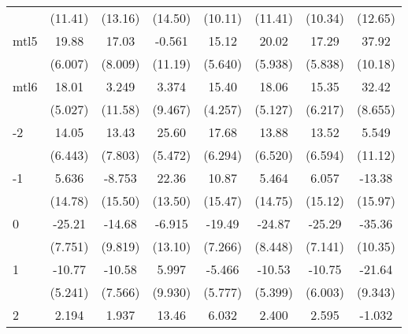 \documentclass{article}
\begin{document}
{\begin{longtable}{l*{7}{c}}
                &  (11.41)         &  (13.16)         &  (14.50)         &  (10.11)         &  (11.41)         &  (10.34)         &  (12.65)         \\
mtl5            &    19.88\sym{**} &    17.03         &   -0.561         &    15.12\sym{*}  &    20.02\sym{**} &    17.29\sym{*}  &    37.92\sym{**} \\
                &  (6.007)         &  (8.009)         &  (11.19)         &  (5.640)         &  (5.938)         &  (5.838)         &  (10.18)         \\
mtl6            &    18.01\sym{**} &    3.249         &    3.374         &    15.40\sym{**} &    18.06\sym{**} &    15.35\sym{*}  &    32.42\sym{**} \\
                &  (5.027)         &  (11.58)         &  (9.467)         &  (4.257)         &  (5.127)         &  (6.217)         &  (8.655)         \\
-2              &    14.05         &    13.43         &    25.60\sym{***}&    17.68\sym{*}  &    13.88         &    13.52         &    5.549         \\
                &  (6.443)         &  (7.803)         &  (5.472)         &  (6.294)         &  (6.520)         &  (6.594)         &  (11.12)         \\
-1              &    5.636         &   -8.753         &    22.36         &    10.87         &    5.464         &    6.057         &   -13.38         \\
                &  (14.78)         &  (15.50)         &  (13.50)         &  (15.47)         &  (14.75)         &  (15.12)         &  (15.97)         \\
0               &   -25.21\sym{**} &   -14.68         &   -6.915         &   -19.49\sym{*}  &   -24.87\sym{*}  &   -25.29\sym{**} &   -35.36\sym{**} \\
                &  (7.751)         &  (9.819)         &  (13.10)         &  (7.266)         &  (8.448)         &  (7.141)         &  (10.35)         \\
1               &   -10.77         &   -10.58         &    5.997         &   -5.466         &   -10.53         &   -10.75         &   -21.64\sym{*}  \\
                &  (5.241)         &  (7.566)         &  (9.930)         &  (5.777)         &  (5.399)         &  (6.003)         &  (9.343)         \\
2               &    2.194         &    1.937         &    13.46         &    6.032         &    2.400         &    2.595         &   -1.032         \\

\end{longtable}}
\end{document}

